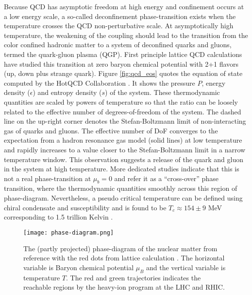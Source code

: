 Because QCD has asymptotic freedom at high energy and confinement occurs at a low energy scale, a so-called deconfinement phase-transition exists when the temperature crosses the QCD non-perturbative scale.
At asymptotically high temperature, the weakening of the coupling should lead to the transition from the color confined hadronic matter to a system of deconfined quarks and gluons, termed the quark-gluon plasma (QGP). 
First principle lattice QCD calculations have studied this transition at zero baryon chemical potential with 2+1 flavors (up, down plus strange quark).
Figure \ref{fig:qcd_eos} quotes the equation of state computed by the HotQCD Collaboration \cite{Bazavov:2014pvz}.
It shows the pressure $P$, energy density ($\epsilon$) and entropy density ($s$) of the system.
These thermodynamic quantities are scaled by powers of temperature so that the ratio can be loosely related to the effective number of degrees-of-freedom of the system.
The dashed line on the up-right corner denotes the Stefan-Boltzmann limit of non-interacting gas of quarks and gluons.
The effective number of DoF converges to the expectation from a hadron resonance gas model (solid lines) at low temperature and rapidly increases to a value closer to the Stefan-Boltzmann limit in a narrow temperature window.
This observation suggests a release of the quark and gluon in the system at high temperature.
More dedicated studies indicate that this is not a real phase-transition at $\mu_b = 0$ and refer it as a ``cross-over'' phase transition, where the thermodynamic quantities smoothly across this region of phase-diagram.
Nevertheless, a pseudo critical temperature can be defined using chiral condensate and susceptibility and is found to be $T_c \approx 154 \pm 9 $ MeV corresponding to 1.5 trillion Kelvin \cite{Bazavov:2011nk}.

\begin{figure}
\singlespacing 
    \centering
    \texttt{[image: phase-diagram.png]}
    \caption[The (partly projected) phase-diagram of the nuclear matter from]{The (partly projected) phase-diagram of the nuclear matter from reference \cite{Geesaman:2015fha} with the red dots from lattice calculation \cite{PhysRevLett.109.192302}. The horizontal variable is Baryon chemical potential $\mu_B$ and the vertical variable is temperature $T$. The red and green trajectories indicates the reachable regions by the heavy-ion program at the LHC and RHIC.}
    \label{fig:phase-diagram}
\end{figure}

